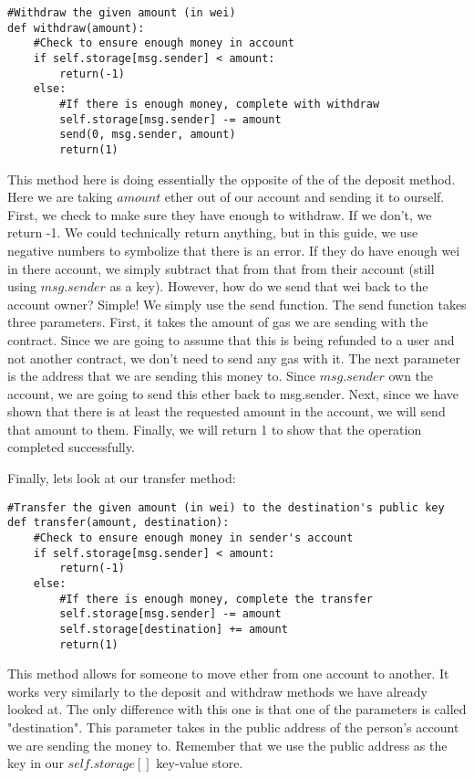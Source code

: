 \documentclass[10pt,twocolumn,letterpaper]{article}
\begin{document}
\begin{verbatim}
#Withdraw the given amount (in wei)
def withdraw(amount):
	#Check to ensure enough money in account
	if self.storage[msg.sender] < amount:
		return(-1)
	else:
		#If there is enough money, complete with withdraw
		self.storage[msg.sender] -= amount
		send(0, msg.sender, amount)
		return(1)
\end{verbatim}

This method here is doing essentially the opposite of the of the deposit method. Here we are taking $amount$ ether out of our account and sending it to ourself. First, we check to make sure they have enough to withdraw. If we don't, we return -1. We could technically return anything, but in this guide, we use negative numbers to symbolize that there is an error. If they do have enough wei in there account, we simply subtract that from that from their account (still using $msg.sender$ as a key). However, how do we send that wei back to the account owner? Simple! We simply use the send function. The send function takes three parameters. First, it takes the amount of gas we are sending with the contract. Since we are going to assume that this is being refunded to a user and not another contract, we don't need to send any gas with it. The next parameter is the address that we are sending this money to. Since $msg.sender$ own the account, we are going to send this ether back to msg.sender. Next, since we have shown that there is at least the requested amount in the account, we will send that amount to them. Finally, we will return 1 to show that the operation completed successfully.

Finally, lets look at our transfer method:

\begin{verbatim}
#Transfer the given amount (in wei) to the destination's public key
def transfer(amount, destination):
	#Check to ensure enough money in sender's account
	if self.storage[msg.sender] < amount:
		return(-1)
	else:
		#If there is enough money, complete the transfer
		self.storage[msg.sender] -= amount
		self.storage[destination] += amount
		return(1)
\end{verbatim}

This method allows for someone to move ether from one account to another. It works very similarly to the deposit and withdraw methods we have already looked at. The only difference with this one is that one of the parameters is called "destination". This parameter takes in the public address of the person's account we are sending the money to. Remember that we use the public address as the key in our $self.storage[]$ key-value store. 
\end{document}
